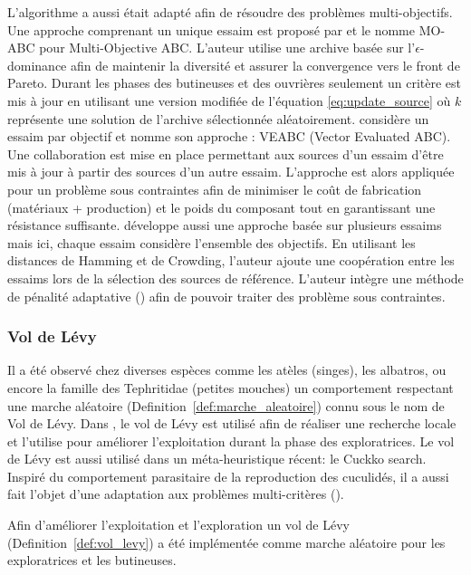 L’algorithme a aussi était adapté afin de résoudre des problèmes multi-objectifs.
Une approche comprenant un unique essaim est proposé par \cite{Akbari201239}
et le nomme MO-ABC pour Multi-Objective ABC.
L’auteur utilise une archive basée sur l’$\epsilon$-dominance afin de maintenir
la diversité et assurer la convergence vers le front de Pareto. Durant les phases
des butineuses et des ouvrières seulement un critère est mis à jour en utilisant
une version modifiée de l’équation \eqref{eq:update_source} où $k$ représente une
solution de l’archive sélectionnée aléatoirement.
\cite{Omkar2011489} considère un essaim par objectif et nomme son approche : VEABC  (Vector Evaluated ABC).
Une collaboration est mise en place permettant aux sources d’un essaim d’être mis
à jour à partir des sources d’un autre essaim. L’approche est alors appliquée pour un
problème sous contraintes afin de minimiser le coût de fabrication (matériaux + production)
et le poids du composant tout en garantissant une résistance suffisante.
\cite{Zhang20121} développe aussi une approche basée sur plusieurs essaims mais ici,
chaque essaim considère l’ensemble des objectifs. En utilisant les distances de Hamming
et de Crowding, l’auteur ajoute une coopération entre les essaims lors de la sélection
des sources de référence. L’auteur intègre une méthode de pénalité adaptative (\cite{Woldesenbet20073077})
afin de pouvoir traiter des problème sous contraintes.


\subsubsection{Vol de Lévy} %
\label{ssub:vol_de_levy}
Il a été observé chez diverses espèces comme les atèles (singes), les albatros, ou encore la famille des
Tephritidae (petites mouches) un comportement respectant une marche aléatoire (Definition~\ref{def:marche_aleatoire}) connu
sous le nom de Vol de Lévy.
Dans \cite{Sharma2012213}, le vol de Lévy est utilisé afin de réaliser une recherche locale
et \cite{Hakli2013254} l’utilise pour améliorer l’exploitation durant la phase des exploratrices.
Le vol de Lévy est aussi utilisé dans un méta-heuristique récent: le Cuckko search.
Inspiré du comportement parasitaire de la reproduction des cuculidés, il a aussi fait l’objet
d’une adaptation aux problèmes multi-critères (\cite{Yang20131616}).

Afin d’améliorer l’exploitation et l’exploration un vol de Lévy (Definition~\ref{def:vol_levy})
a été implémentée comme marche aléatoire pour les exploratrices et les butineuses.


